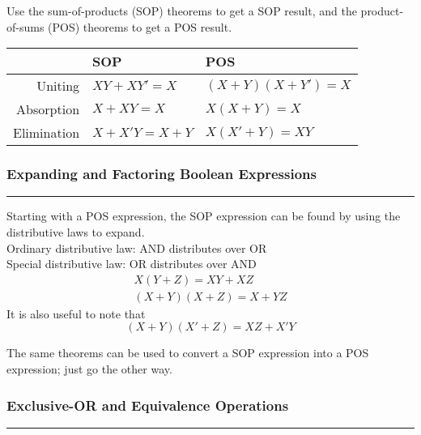\documentclass{article}
\begin{document}
    \smallskip\noindent
    Use the sum-of-products (SOP) theorems to get a SOP result, and the product-of-sums (POS) theorems to get a POS result.

    \medskip
    \begin{center}
        \begin{tabular}{ r | l l}
            & SOP         & POS             \\
            \hline
            Uniting     & $XY+XY'=X$  & $(X+Y)(X+Y')=X$ \\
            Absorption  & $X+XY=X$    & $X(X+Y)=X$      \\
            Elimination & $X+X'Y=X+Y$ & $X(X'+Y)=XY$
        \end{tabular}
    \end{center}

    \pagebreak
    \smallskip\noindent
    \subsubsection*{Expanding and Factoring Boolean Expressions}
    \vspace{-1em}
    \rule{\linewidth}{0.1mm}

    \vspace{.2em}\noindent
    Starting with a POS expression, the SOP expression can be found by using the distributive laws to expand. \\[.5em]
    Ordinary distributive law: AND distributes over OR\\
    Special distributive law: OR distributes over AND
    \begin{gather*}
        X(Y+Z)=XY+XZ    \tag{ordinary}  \\
        (X+Y)(X+Z)=X+YZ \tag{special}
    \end{gather*}
    It is also useful to note that
    \[
        (X+Y)(X'+Z) = XZ+X'Y
    \]

    \smallskip\noindent
    The same theorems can be used to convert a SOP expression into a POS expression;
    just go the other way.

    \smallskip\noindent
    \subsubsection*{Exclusive-OR and Equivalence Operations}
    \vspace{-1em}
    \rule{\linewidth}{.1mm}
\end{document}
